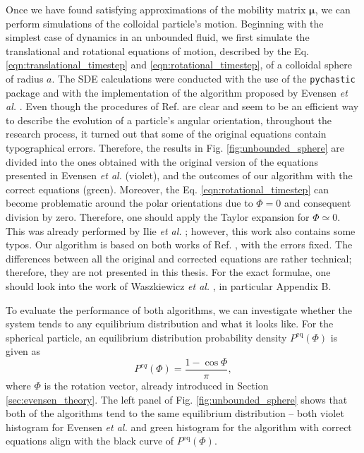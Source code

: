 \documentclass{master_thesis}
\def\code#1{\texttt{#1}}
\begin{document}
Once we have found satisfying approximations of the mobility matrix $\bm{\mu}$, we can perform simulations of the colloidal particle's motion. Beginning with the simplest case of dynamics in an unbounded fluid, we first simulate the translational and rotational equations of motion, described by the Eq. \eqref{eqn:translational_timestep} and \eqref{eqn:rotational_timestep}, of a colloidal sphere of radius $a$. The SDE calculations were conducted with the use of the \code{pychastic} package and with the implementation of the algorithm proposed by Evensen \textit{et al.} \cite{evensen2008}. Even though the procedures of Ref. \cite{evensen2008} are clear and seem to be an efficient way to describe the evolution of a particle's angular orientation, throughout the research process, it turned out that some of the original equations contain typographical errors. Therefore, the results in Fig. \ref{fig:unbounded_sphere} are divided into the ones obtained with the original version of the equations presented in Evensen \textit{et al.} \cite{evensen2008} (violet), and the outcomes of our algorithm with the correct equations (green). Moreover, the Eq. \eqref{eqn:rotational_timestep} can become problematic around the polar orientations due to $\Phi=0$ and consequent division by zero. Therefore, one should apply the Taylor expansion for $\Phi\simeq 0$. This was already performed by Ilie \textit{et al.} \cite{ilie2014}; however, this work also contains some typos. Our algorithm is based on both works of Ref. \cite{evensen2008,ilie2014}, with the errors fixed. The differences between all the original and corrected equations are rather technical; therefore, they are not presented in this thesis. For the exact formulae, one should look into the work of Waszkiewicz \textit{et al.} \cite{waszkiewicz2023}, in particular Appendix B.

To evaluate the performance of both algorithms, we can investigate whether the system tends to any equilibrium distribution and what it looks like. For the spherical particle, an equilibrium distribution probability density $P^{\textrm{eq}}(\Phi)$ is given as
\begin{equation}
    P^{eq}(\Phi)=\frac{1-\cos\Phi}{\pi},
\label{eqn:equilibrium_probability}
\end{equation}
where $\Phi$ is the rotation vector, already introduced in Section \ref{sec:evensen_theory}. The left panel of Fig. \ref{fig:unbounded_sphere} shows that both of the algorithms tend to the same equilibrium distribution -- both violet histogram for Evensen \textit{et al.} \cite{evensen2008} and green histogram for the algorithm with correct equations align with the black curve of $P^{\textrm{eq}}(\Phi)$.
\end{document}
